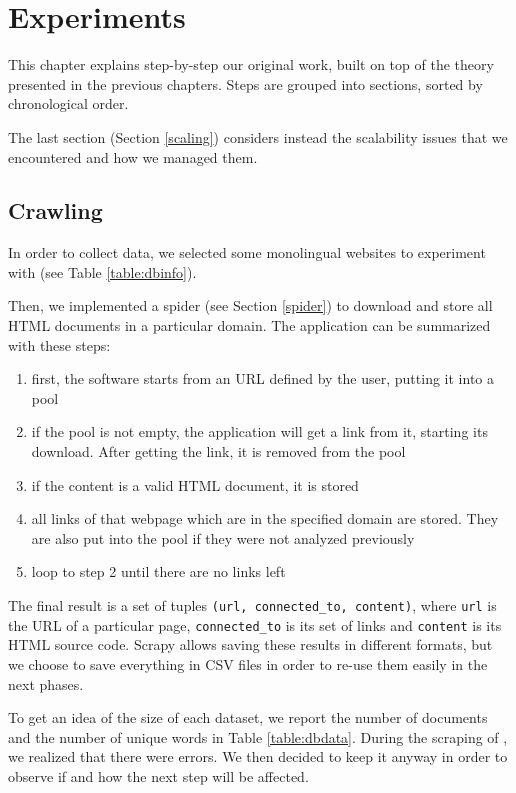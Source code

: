 \chapter{Experiments}
This chapter explains step-by-step our original work, built on top of the theory presented in the previous chapters.
Steps are grouped into sections, sorted by chronological order.

The last section (Section \ref{scaling}) considers instead the scalability issues that we encountered and how we managed them.

\section{Crawling}
In order to collect data, we selected some monolingual websites to experiment with (see Table \ref{table:dbinfo}).

Then, we implemented a spider (see Section \ref{spider}) to download and store all HTML documents in a particular domain.
The application can be summarized with these steps:
\begin{enumerate}
    \item first, the software starts from an URL defined by the user, putting it into a pool
    \item if the pool is not empty, the application will get a link from it, starting its download. After getting the link, it is removed from the pool
    \item if the content is a valid HTML document, it is stored
    \item all links of that webpage which are in the specified domain are stored. They are also put into the pool if they were not analyzed previously
    \item loop to step 2 until there are no links left
\end{enumerate}
The final result is a set of tuples \texttt{(url, connected\_to, content)}, where \texttt{url} is the URL of a particular page, \texttt{connected\_to} is its set of links and \texttt{content} is its HTML source code.
Scrapy allows saving these results in different formats, but we choose to save everything in CSV files in order to re-use them easily in the next phases.

To get an idea of the size of each dataset, we report the number of documents and the number of unique words in Table \ref{table:dbdata}.
During the scraping of , we realized that there were errors. We then decided to keep it anyway in order to observe if and how the next step will be affected.

